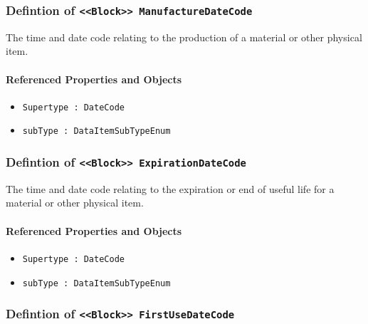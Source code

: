 \subsubsection{Defintion of \texttt{<<Block>> ManufactureDateCode}}
  \label{type:ManufactureDateCode}

\FloatBarrier

The time and date code relating to the production of a material or other physical item.

\FloatBarrier
\paragraph{Referenced Properties and Objects}

\begin{itemize}
\item \texttt{Supertype : DateCode}

\item \texttt{subType : DataItemSubTypeEnum}

\end{itemize}
\FloatBarrier
\subsubsection{Defintion of \texttt{<<Block>> ExpirationDateCode}}
  \label{type:ExpirationDateCode}

\FloatBarrier

The time and date code relating to the expiration or end of useful life for a material or other physical item.

\FloatBarrier
\paragraph{Referenced Properties and Objects}

\begin{itemize}
\item \texttt{Supertype : DateCode}

\item \texttt{subType : DataItemSubTypeEnum}

\end{itemize}
\FloatBarrier
\subsubsection{Defintion of \texttt{<<Block>> FirstUseDateCode}}
  \label{type:FirstUseDateCode}

\FloatBarrier

